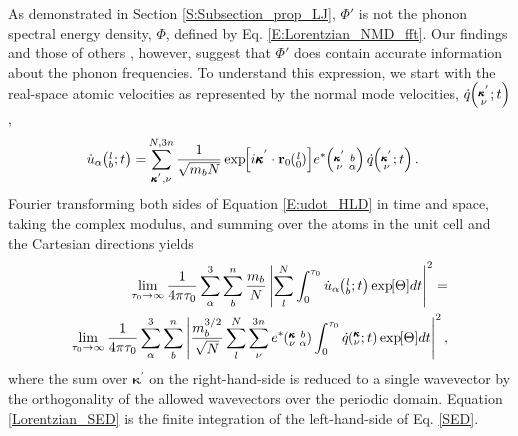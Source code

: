 As demonstrated in Section \ref{S:Subsection_prop_LJ}, $\Phi'$ is not 
the phonon spectral energy density, $\Phi$, defined by Eq$.$ 
\eqref{E:Lorentzian_NMD_fft}. Our findings and those of others 
\cite{maruyama_molecular_2003,koker_thermal_2009,
thomas_predicting_2010,qiu_molecular_2011,shiomi_thermal_2011}, 
however, suggest that $\Phi'$ does contain accurate information about 
the phonon frequencies. To understand this expression, we start with 
the real-space atomic velocities as 
represented by the normal mode velocities, $\dot{q}\mspace{-4.0mu}\left(\mspace{-8.0mu} \begin{smallmatrix}&\pmb{\kappa}^{'} \\&\nu\end{smallmatrix} \mspace{-2.0mu};t\right)$ 
\cite{dove_introduction_1993},
\begin{equation}\label{E:udot_HLD}
\begin{split}
\dot{u}_{\alpha}\lbt = &\SUMprime{2}{} \frac{1}{\sqrt{m_bN}} 
\EXP{i\pmb{\kappa}^{'}\cdot\mathbf{r}_0\ab{l}{0}} e^*\kpvba 
\dot{q}\kpvt{}{}{}.
\end{split}
\end{equation}
Fourier transforming both sides of Equation \eqref{E:udot_HLD} in time 
and space, taking the complex modulus, and summing over the atoms in 
the unit cell 
and the Cartesian directions yields
\begin{equation}\label{SED}
\begin{split}
\lim_{\tau_0\rightarrow\infty}\frac{1}{4\pi\tau_0} \sum_\alpha^3 
\sum_b^n \frac{m_b}{N} 
\left\lvert \sum_l^N  \int_{0}^{\tau_0} \dot{u}_{\alpha}\lbt 
\EXP{\Theta} dt \right\rvert^2 =
\\ \lim_{\tau_0\rightarrow\infty}\frac{1}{4\pi\tau_0} \sum_\alpha^3 
\sum_b^n 
\left\lvert \frac{m_b^{3/2}}{\sqrt{N}} \sum_l^N \sum_{\nu}^{3n} e^*\kvba 
\int_{0}^{\tau_0}\dot{q}\kvt\EXP{\Theta}dt \right\rvert^2 ,
\end{split}
\end{equation}
where the sum over $\pmb{\kappa}^{'}$ on the right-hand-side is 
reduced to a 
single wavevector by the orthogonality of the allowed wavevectors over 
the periodic 
domain. Equation \eqref{Lorentzian_SED} is the finite integration of the 
left-hand-side of Eq. \eqref{SED}.


